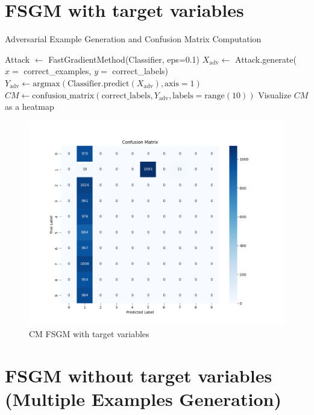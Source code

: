 \documentclass[11pt,onside]{article}
\begin{document}
\section{FSGM with target variables}

\begin{algorithm}[H]

\caption{Adversarial Example Generation and Confusion Matrix Computation}
\begin{algorithmic}[1]
\State Attack $\gets$ FastGradientMethod(Classifier, eps=0.1)
\State $X_{\text{adv}} \gets$ Attack.generate($x=$ correct\_examples, $y=$ correct\_labels)
\State $Y_{\text{adv}} \gets \text{argmax}(\text{Classifier.predict}(X_{\text{adv}}), \text{axis}=1)$
\State $CM \gets \text{confusion\_matrix}(\text{correct\_labels}, Y_{\text{adv}}, \text{labels}=\text{range}(10))$
\State Visualize $CM$ as a heatmap
\end{algorithmic}
\end{algorithm}

\begin{figure}[h]
\centering
\includegraphics[width=1\textwidth]{V1_images/FGM_with_target.png}
\caption{CM FSGM with target variables}
\label{fig: FSGM with target variables}
\end{figure}


\section{FSGM without target variables (Multiple Examples Generation)}
\end{document}
